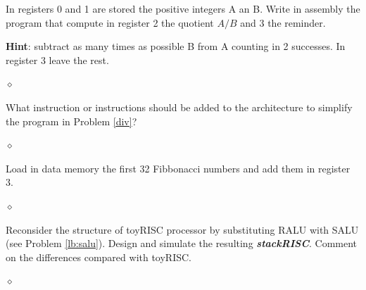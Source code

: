 \begin{problem}\label{div}
In registers 0 and 1 are stored the positive integers A an B. Write in assembly the program that compute in register 2 the quotient $A / B$ and 3 the reminder.

{\bf Hint}: subtract as many times as possible B from A counting in 2 successes. In register 3 leave the rest.

$\diamond$
\end{problem}

\begin{problem}
What instruction or instructions should be added to the architecture to simplify the program in Problem \ref{div}?

$\diamond$
\end{problem}

\begin{problem}
Load in data memory the first 32 Fibbonacci numbers and  add them in register 3.

$\diamond$
\end{problem}

\begin{problem}
Reconsider the structure of toyRISC processor by substituting RALU with SALU (see Problem \ref{lb:salu}). Design and simulate the resulting {\bf {\em stackRISC}}. Comment on the differences compared with toyRISC.

$\diamond$
\end{problem}

